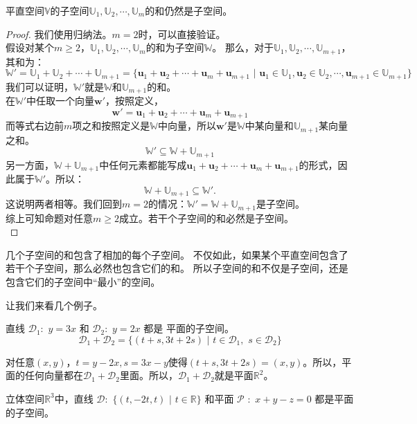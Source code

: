 \documentclass[12pt,UTF8]{ctexbook}
\begin{document}
\begin{pp}\label{pp:1_7}
    平直空间$\mathbb{V}$的子空间$\mathbb{U}_1, \mathbb{U}_2, \cdots , \mathbb{U}_m$的和仍然是子空间。
\end{pp}
\begin{proof} %
我们使用归纳法。$m=2$时，可以直接验证。\\
假设对某个$m \ge 2$，$\mathbb{U}_1, \mathbb{U}_2, \cdots , \mathbb{U}_m$的和为子空间$\mathbb{W}$。
那么，对于$\mathbb{U}_1, \mathbb{U}_2, \cdots , \mathbb{U}_{m+1}$，其和为：
$$ \mathbb{W}' = \mathbb{U}_1 + \mathbb{U}_2 + \cdots +\mathbb{U}_{m+1} = \{\mathbf{u}_1+\mathbf{u}_2+\cdots+\mathbf{u}_m+\mathbf{u}_{m+1} \,\, | \,\, \mathbf{u}_1 \in \mathbb{U}_1, \mathbf{u}_2 \in \mathbb{U}_2, \cdots , \mathbf{u}_{m+1} \in \mathbb{U}_{m+1} \}$$
我们可以证明，$\mathbb{W}'$就是$\mathbb{W}$和$\mathbb{U}_{m+1}$的和。\\
在$\mathbb{W}'$中任取一个向量$\mathbf{w}'$，按照定义，
$$\mathbf{w}' = \mathbf{u}_1+\mathbf{u}_2+\cdots+\mathbf{u}_m+\mathbf{u}_{m+1}$$
而等式右边前$m$项之和按照定义是$\mathbb{W}$中向量，所以$\mathbf{w}'$是$\mathbb{W}$中某向量和$\mathbb{U}_{m+1}$某向量之和。
$$\mathbb{W}' \subseteq \mathbb{W} + \mathbb{U}_{m+1}$$
另一方面，$\mathbb{W} + \mathbb{U}_{m+1}$中任何元素都能写成$\mathbf{u}_1+\mathbf{u}_2+\cdots+\mathbf{u}_m+\mathbf{u}_{m+1}$的形式，因此属于$\mathbb{W}'$。所以：
$$\mathbb{W} + \mathbb{U}_{m+1} \subseteq \mathbb{W}'.$$
这说明两者相等。我们回到$m=2$的情况：$\mathbb{W}' = \mathbb{W} + \mathbb{U}_{m+1}$是子空间。\\
综上可知命题对任意$m \ge 2$成立。若干个子空间的和必然是子空间。\\
\end{proof}


几个子空间的和包含了相加的每个子空间。
不仅如此，如果某个平直空间包含了若干个子空间，那么必然也包含它们的和。
所以子空间的和不仅是子空间，还是包含它们的子空间中“最小”的空间。

让我们来看几个例子。

直线 $\mathcal{D}_1: \,\, y = 3x$ 和 $\mathcal{D}_2: \,\, y = 2x$ 都是
平面的子空间。
$$\mathcal{D}_1 + \mathcal{D}_2 = \{(t+s, 3t+2s) \,\, | \,\, t \in \mathcal{D}_1, \,\, s \in \mathcal{D}_2 \}$$

对任意$(x,y)$，$t = y - 2x, s = 3x - y$使得$(t+s, 3t+2s) = (x, y)$。所以，平面的任何向量都在$\mathcal{D}_1 + \mathcal{D}_2$里面。所以，$\mathcal{D}_1 + \mathcal{D}_2$就是平面$\mathbb{R}^2$。

立体空间$\mathbb{R}^3$中，直线 $\mathcal{D}: \,\, \{(t,-2t,t) \,\, |\,\, t\in\mathbb{R}\}$ 和平面 $\mathcal{P} \,\, : \,\, x + y - z = 0$ 都是平面的子空间。
\end{document}
